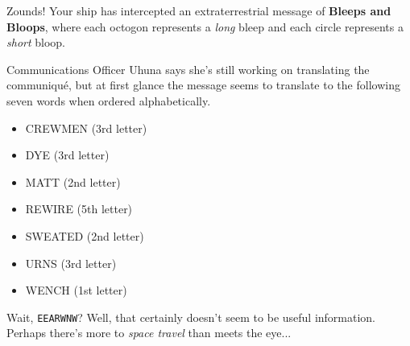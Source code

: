 Zounds! Your ship has intercepted an extraterrestrial message of
\textbf{Bleeps and Bloops}, where each octogon
represents a \textit{long} bleep and each circle represents
a \textit{short} bloop.

Communications Officer Uhuna says she's still working
on translating the communiqu\'e, but at first glance the message
seems to translate to the following seven words when ordered
alphabetically.

\begin{itemize}
\item CREWMEN (3rd letter)
\item DYE (3rd letter)
\item MATT (2nd letter)
\item REWIRE (5th letter)
\item SWEATED (2nd letter)
\item URNS (3rd letter)
\item WENCH (1st letter)
\end{itemize}

Wait, \texttt{EEARWNW}?
Well, that certainly doesn't seem to be useful information.
Perhaps there's more to \textit{space travel} than meets the eye... 
